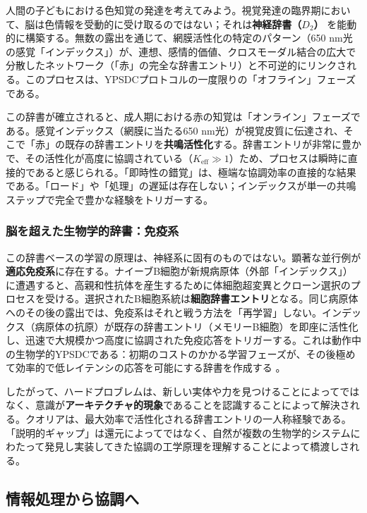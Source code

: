 \documentclass[12pt,a4paper]{article}
\begin{document}
	人間の子どもにおける色知覚の発達を考えてみよう。視覚発達の臨界期において、脳は色情報を受動的に受け取るのではない；それは\textbf{神経辞書（\(D_2\)）} を能動的に構築する。無数の露出を通じて、網膜活性化の特定のパターン（650 nm光の感覚「インデックス」）が、連想、感情的価値、クロスモーダル結合の広大で分散したネットワーク（「赤」の完全な辞書エントリ）と不可逆的にリンクされる。このプロセスは、YPSDCプロトコルの一度限りの「オフライン」フェーズである。
	
	この辞書が確立されると、成人期における赤の知覚は「オンライン」フェーズである。感覚インデックス（網膜に当たる650 nm光）が視覚皮質に伝達され、そこで「赤」の既存の辞書エントリを\textbf{共鳴活性化}する。辞書エントリが非常に豊かで、その活性化が高度に協調されている（\(K_{\mathrm{eff}} \gg 1\)）ため、プロセスは瞬時に直接的であると感じられる。「即時性の錯覚」は、極端な協調効率の直接的な結果である。「ロード」や「処理」の遅延は存在しない；インデックスが単一の共鳴ステップで完全で豊かな経験をトリガーする。
	
	\subsubsection{脳を超えた生物学的辞書：免疫系}
	
	この辞書ベースの学習の原理は、神経系に固有のものではない。顕著な並行例が\textbf{適応免疫系}に存在する。ナイーブB細胞が新規病原体（外部「インデックス」）に遭遇すると、高親和性抗体を産生するために体細胞超変異とクローン選択のプロセスを受ける。選択されたB細胞系統は\textbf{細胞辞書エントリ}となる。同じ病原体へのその後の露出では、免疫系はそれと戦う方法を「再学習」しない。インデックス（病原体の抗原）が既存の辞書エントリ（メモリーB細胞）を即座に活性化し、迅速で大規模かつ高度に協調された免疫応答をトリガーする。これは動作中の生物学的YPSDCである：初期のコストのかかる学習フェーズが、その後極めて効率的で低レイテンシの応答を可能にする辞書を作成する \cite{Alberts2014}。
	
	したがって、ハードプロブレムは、新しい実体や力を見つけることによってではなく、意識が\textbf{アーキテクチャ的現象}であることを認識することによって解決される。クオリアは、最大効率で活性化される辞書エントリの一人称経験である。「説明的ギャップ」は還元によってではなく、自然が複数の生物学的システムにわたって発見し実装してきた協調の工学原理を理解することによって橋渡しされる。
	
	\subsection{情報処理から協調へ}
	
\end{document}
